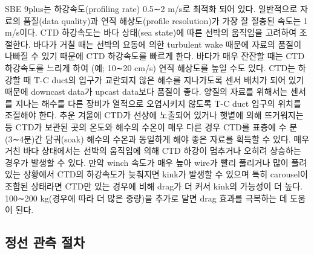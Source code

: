 \documentclass[
]{book}
\begin{document}
SBE 9plus는 하강속도(profiling rate) 0.5∼2 m/s로 최적화 되어 있다. 일반적으로 자료의 품질(data quality)과 연직 해상도(profile resolution)가 가장 잘 절충된 속도는 1 m/s이다. CTD 하강속도는 바다 상태(sea state)에 따른 선박의 움직임을 고려하여 조절한다. 바다가 거칠 때는 선박의 요동에 의한 turbulent wake 때문에 자료의 품질이 나빠질 수 있기 때문에 CTD 하강속도를 빠르게 한다. 바다가 매우 잔잔할 때는 CTD 하강속도를 느리게 하여 (예; 10∼20 cm/s) 연직 해상도를 높일 수도 있다.
CTD는 하강할 때 T-C duct의 입구가 교란되지 않은 해수를 지나가도록 센서 배치가 되어 있기 때문에 downcast data가 upcast data보다 품질이 좋다. 양질의 자료를 위해서는 센서를 지나는 해수를 다른 장비가 열적으로 오염시키지 않도록 T-C duct 입구의 위치를 조절해야 한다.
추운 겨울에 CTD가 선상에 노출되어 있거나 햇볕에 의해 뜨거워지는 등 CTD가 보관된 곳의 온도와 해수의 수온이 매우 다른 경우 CTD를 표층에 수 분(3∼4분)간 담궈(soak) 해수의 수온과 동일하게 해야 좋은 자료를 획득할 수 있다.
매우 거친 바다 상태에서는 선박의 움직임에 의해 CTD 하강이 멈추거나 오히려 상승하는 경우가 발생할 수 있다. 만약 winch 속도가 매우 높아 wire가 빨리 풀리거나 많이 풀려 있는 상황에서 CTD의 하강속도가 늦춰지면 kink가 발생할 수 있으며 특히 carousel이 조합된 상태라면 CTD만 있는 경우에 비해 drag가 더 커서 kink의 가능성이 더 높다. 100∼200 kg(경우에 따라 더 많은 중량)을 추가로 달면 drag 효과를 극복하는 데 도움이 된다.

\hypertarget{uxc815uxc120-uxad00uxce21-uxc808uxcc28}{%
\subsection{정선 관측 절차}\label{uxc815uxc120-uxad00uxce21-uxc808uxcc28}}
\end{document}
